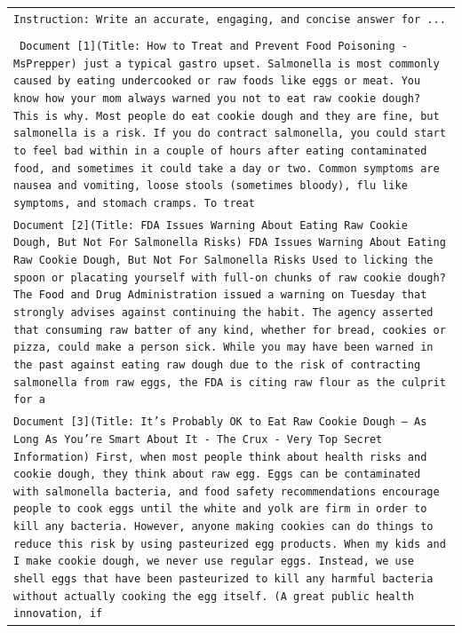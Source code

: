 \documentclass[11pt]{article}
\begin{document}
\begin{table}[h]
    \centering
    \small
    \begin{tabular}{>{\raggedright\arraybackslash\tt}p{}<{}}
        \toprule
            Instruction: Write an accurate, engaging, and concise answer for ... \\
            \\
            \vspace{-1em}
            Document {[1]}(Title: How to Treat and Prevent Food Poisoning - MsPrepper) just a typical gastro upset. Salmonella is most commonly caused by eating undercooked or raw foods like eggs or meat. You know how your mom always warned you not to eat raw cookie dough? This is why. Most people do eat cookie dough and they are fine, but salmonella is a risk. If you do contract salmonella, you could start to feel bad within in a couple of hours after eating contaminated food, and sometimes it could take a day or two. Common symptoms are nausea and vomiting, loose stools (sometimes bloody), flu like symptoms, and stomach cramps. To treat \\
            Document {[2]}(Title: FDA Issues Warning About Eating Raw Cookie Dough, But Not For Salmonella Risks) FDA Issues Warning About Eating Raw Cookie Dough, But Not For Salmonella Risks Used to licking the spoon or placating yourself with full-on chunks of raw cookie dough? The Food and Drug Administration issued a warning on Tuesday that strongly advises against continuing the habit. The agency asserted that consuming raw batter of any kind, whether for bread, cookies or pizza, could make a person sick. While you may have been warned in the past against eating raw dough due to the risk of contracting salmonella from raw eggs, the FDA is citing raw flour as the culprit for a \\
            Document {[3]}(Title: It's Probably OK to Eat Raw Cookie Dough — As Long As You're Smart About It - The Crux - Very Top Secret Information) First, when most people think about health risks and cookie dough, they think about raw egg. Eggs can be contaminated with salmonella bacteria, and food safety recommendations encourage people to cook eggs until the white and yolk are firm in order to kill any bacteria. However, anyone making cookies can do things to reduce this risk by using pasteurized egg products. When my kids and I make cookie dough, we never use regular eggs. Instead, we use shell eggs that have been pasteurized to kill any harmful bacteria without actually cooking the egg itself. (A great public health innovation, if \\

\end{tabular}
\end{table}
\end{document}
